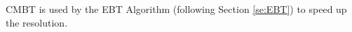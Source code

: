 \documentclass[11pt,a4paper,twoside,openright]{book}
\begin{document}
CMBT is used by the EBT Algorithm (following Section \ref{se:EBT}) to speed up the resolution.

\end{document}
